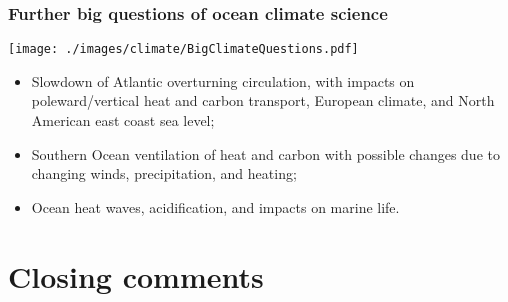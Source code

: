 \documentclass[10pt]{beamer}
\begin{document}
\begin{frame}
  \frametitle{Further big questions of ocean climate science}

\begin{center}
\vspace{-.3cm}
{\texttt{[image: ./images/climate/BigClimateQuestions.pdf]}}
\vspace{-0.25cm}
\end{center}

\vspace{-0.25cm}
\begin{exampleblock}{}
\begin{itemize}

\item Slowdown of Atlantic overturning circulation, with impacts on
  poleward/vertical heat and carbon transport, European climate, and
  North American east coast sea level;

\item Southern Ocean ventilation of heat and carbon with possible
  changes due to changing winds, precipitation, and heating;

\item Ocean heat waves, acidification, and impacts on marine life.

\end{itemize}
\end{exampleblock}{}

\end{frame}





\section{Closing comments}
\end{document}
